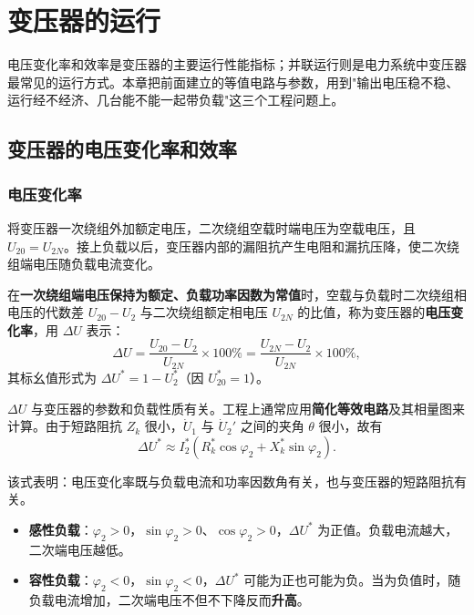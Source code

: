 \chapter{变压器的运行}

电压变化率和效率是变压器的主要运行性能指标；并联运行则是电力系统中变压器最常见的运行方式。本章把前面建立的等值电路与参数，用到"输出电压稳不稳、运行经不经济、几台能不能一起带负载"这三个工程问题上。

\section{变压器的电压变化率和效率}

\subsection{电压变化率}
将变压器一次绕组外加额定电压，二次绕组空载时端电压为空载电压，且 $U_{20}=U_{2N}$。接上负载以后，变压器内部的漏阻抗产生电阻和漏抗压降，使二次绕组端电压随负载电流变化。

在\textbf{一次绕组端电压保持为额定、负载功率因数为常值}时，空载与负载时二次绕组相电压的代数差 $U_{20}-U_2$ 与二次绕组额定相电压 $U_{2N}$ 的比值，称为变压器的\textbf{电压变化率}，用 $\Delta U$ 表示：
\begin{equation}
\Delta U=\frac{U_{20}-U_2}{U_{2N}}\times100\%=\frac{U_{2N}-U_2}{U_{2N}}\times100\% ,
\end{equation}
其标幺值形式为 $\Delta U^{*}=1-U_2^{*}$（因 $U_{20}^{*}=1$）。

$\Delta U$ 与变压器的参数和负载性质有关。工程上通常应用\textbf{简化等效电路}及其相量图来计算。由于短路阻抗 $Z_k$ 很小，$\dot U_1$ 与 $\dot U_2'$ 之间的夹角 $\theta$ 很小，故有
\begin{equation}
\Delta U^{*}\approx I_2^{*}\left(R_k^{*}\cos\varphi_2+X_k^{*}\sin\varphi_2\right).
\end{equation}


该式表明：电压变化率既与负载电流和功率因数角有关，也与变压器的短路阻抗有关。

\begin{itemize}
  \item \textbf{感性负载}：$\varphi_2>0$，$\sin\varphi_2>0$、$\cos\varphi_2>0$，$\Delta U^{*}$ 为正值。负载电流越大，二次端电压越低。
  \item \textbf{容性负载}：$\varphi_2<0$，$\sin\varphi_2<0$，$\Delta U^{*}$ 可能为正也可能为负。当为负值时，随负载电流增加，二次端电压不但不下降反而\textbf{升高}。
\end{itemize}

